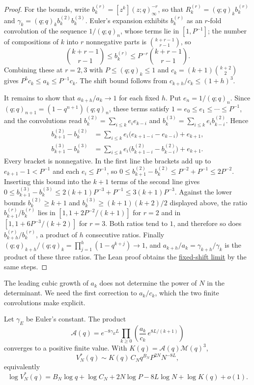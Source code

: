 \documentclass[11pt]{article}
\newcommand{\latecommit}{035c414b25fda09ae0d2e56358b8716d321ebd99}
\newcommand{\laterepobase}{https://github.com/wcook04/plectis-erdos/blob/\latecommit}
\begin{document}
\begin{proof}
For the bounds, write $b_k^{(r)}=[z^k](z;q)_\infty^{-r}$, so that
$R_k^{(r)}=(q;q)_kb_k^{(r)}$ and
$\gamma_k=(q;q)_kb_k^{(2)}b_k^{(3)}$. Euler's expansion exhibits $b_k^{(r)}$ as
an $r$-fold convolution of the sequence $1/(q;q)_n$, whose terms lie in
$[1,P^{-1}]$; the number of compositions of $k$ into $r$ nonnegative parts is
$\binom{k+r-1}{r-1}$, so
\[
 \binom{k+r-1}{r-1}\le b_k^{(r)}\le P^{-r}\binom{k+r-1}{r-1}.
\]
Combining these at $r=2,3$ with $P\le(q;q)_k\le1$ and
$c_k=(k+1)\binom{k+2}2$ gives $P^5c_k\le a_k\le P^{-1}c_k$. The shift bound
follows from $c_{k+h}/c_k\le(1+h)^3$.

It remains to show that $a_{k+h}/a_k\to1$ for each fixed $h$. Put
$e_n=1/(q;q)_n$. Since $(q;q)_{n+1}=(1-q^{n+1})(q;q)_n$, these terms satisfy
$1=e_0\le e_1\le\cdots\le P^{-1}$, and the convolutions read
$b_k^{(2)}=\sum_{i\le k}e_ie_{k-i}$ and
$b_k^{(3)}=\sum_{i\le k}e_ib_{k-i}^{(2)}$. Hence
\[
 \begin{aligned}
 b_{k+1}^{(2)}-b_k^{(2)}
 &=\sum_{i\le k}e_i\bigl(e_{k+1-i}-e_{k-i}\bigr)+e_{k+1},\\
 b_{k+1}^{(3)}-b_k^{(3)}
 &=\sum_{i\le k}e_i\bigl(b_{k+1-i}^{(2)}-b_{k-i}^{(2)}\bigr)+e_{k+1}.
 \end{aligned}
\]
Every bracket is nonnegative. In the first line the brackets add up to
$e_{k+1}-1<P^{-1}$ and each $e_i\le P^{-1}$, so
$0\le b_{k+1}^{(2)}-b_k^{(2)}\le P^{-2}+P^{-1}\le2P^{-2}$. Inserting this
bound into the $k+1$ terms of the second line gives
$0\le b_{k+1}^{(3)}-b_k^{(3)}\le2(k+1)P^{-3}+P^{-1}\le3(k+1)P^{-3}$.
Against the lower bounds $b_k^{(2)}\ge k+1$ and
$b_k^{(3)}\ge(k+1)(k+2)/2$ displayed above, the ratio
$b_{k+1}^{(r)}/b_k^{(r)}$ lies in $[1,1+2P^{-2}/(k+1)]$ for $r=2$ and in
$[1,1+6P^{-3}/(k+2)]$ for $r=3$. Both ratios tend to $1$, and therefore so
does $b_{k+h}^{(r)}/b_k^{(r)}$, a product of $h$ consecutive ratios.
Finally $(q;q)_{k+h}/(q;q)_k=\prod_{j=1}^h(1-q^{k+j})\to1$, and
$a_{k+h}/a_k=\gamma_{k+h}/\gamma_k$ is the product of these three ratios.
The Lean proof obtains the
\href{\laterepobase/lean/ErdosProblems/Erdos1049/PaperCompleteR21/RogersFactorisationAnalytic.lean\#L1097}{fixed-shift limit}
by the same steps.
\end{proof}

The leading cubic growth of $a_k$ does not determine the power of $N$
in the determinant. We need the first correction to $a_k/c_k$,
which the two finite convolutions make explicit.

\begin{theorem}
\label{long1049:thm:sharp-fixed-base}
Let $\gamma_{\!E}$ be Euler's constant. The product
\[
 \mathcal A(q)=e^{-8\gamma_{\!E}L}
 \prod_{k\ge0}\left(\frac{a_k}{c_k}\,e^{8L/(k+1)}\right)
\]
converges to a positive finite value. With $K(q)=\mathcal A(q)\mathcal M(q)^3$,
\[
 V_N^*(q)\sim K(q)\,C_Nq^{B_N}P^{2N}N^{-8L},
\]
equivalently
\[
 \log V_N^*(q)=B_N\log q+\log C_N+2N\log P-8L\log N+\log K(q)+o(1).
\]
\end{theorem}
\end{document}

